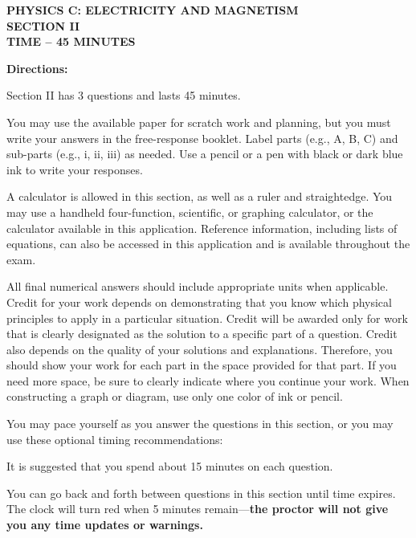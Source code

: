 \documentclass[12pt]{../../oss-apphys-exam}
\begin{document}
\begin{center}
  {\Large\textbf{PHYSICS C: ELECTRICITY AND MAGNETISM\\
      SECTION II\\
      TIME -- 45 MINUTES
    }
  }
\end{center}


\vspace{2in}
\textbf{Directions:}

Section II has 3 questions and lasts 45 minutes.

You may use the available paper for scratch work and planning, but you must
write your answers in the free-response booklet. Label parts (e.g., A, B, C)
and sub-parts (e.g., i, ii, iii) as needed. Use a pencil or a pen with black or
dark blue ink to write your responses.

A calculator is allowed in this section, as well as a ruler and straightedge.
You may use a handheld four-function, scientific, or graphing calculator, or
the calculator available in this application. Reference information, including
lists of equations, can also be accessed in this application and is available
throughout the exam.

All final numerical answers should include appropriate units when applicable.
Credit for your work depends on demonstrating that you know which physical
principles to apply in a particular situation. Credit will be awarded only for
work that is clearly designated as the solution to a specific part of a
question. Credit also depends on the quality of your solutions and explanations.
Therefore, you should show your work for each part in the space provided for
that part. If you need more space, be sure to clearly indicate where you
continue your work. When constructing a graph or diagram, use only one color of
ink or pencil.

You may pace yourself as you answer the questions in this section, or you may
use these optional timing recommendations:

It is suggested that you spend about 15 minutes on each question.

You can go back and forth between questions in this section until time expires.
The clock will turn red when 5 minutes remain---\textbf{the proctor will not
  give you any time updates or warnings.}
\newpage
\end{document}
